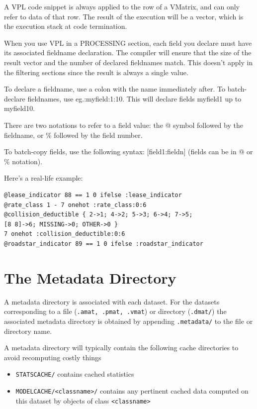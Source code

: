 \documentclass[11pt]{book}
\begin{document}
A VPL code snippet is always applied to the row of a VMatrix, and can only refer to data of that row. The result of the execution will be a vector, which is the execution stack at code termination. 

When you use VPL in a PROCESSING section, each field you declare must have its associated fieldname declaration. The compiler will ensure that the size of the result vector and the number of declared fieldnames match. This doesn't apply in the filtering sections since the result is always a single value. 

To declare a fieldname, use a colon with the name immediately after. To batch-declare fieldnames, use eg.:myfield:1:10. This will declare fields myfield1 up to myfield10.

There are two notations to refer to a field value: the @ symbol followed by the fieldname, or \% followed by the field number.

To batch-copy fields, use the following syntax: [field1:fieldn] (fields can be in @ or \% notation).

Here's a real-life example:

\begin{verbatim}
@lease_indicator 88 == 1 0 ifelse :lease_indicator
@rate_class 1 - 7 onehot :rate_class:0:6
@collision_deductible { 2->1; 4->2; 5->3; 6->4; 7->5; 
[8 8]->6; MISSING->0; OTHER->0 }
7 onehot :collision_deductible:0:6
@roadstar_indicator 89 == 1 0 ifelse :roadstar_indicator
\end{verbatim}

\section{The Metadata Directory}

A metadata directory is associated with each dataset.  For the datasets
corresponding to a file ({\tt .amat, .pmat, .vmat}) or directory ({\tt .dmat/}) the
associated metadata directory is obtained by appending {\tt .metadata/} to the
file or directory name.

A metadata directory will typically contain the following cache directories to avoid recomputing costly things

\begin{itemize}
\item \verb!STATSCACHE/! contains cached statistics
\item \verb!MODELCACHE/<classname>/! contains any pertinent cached data computed on this dataset by objects of class \verb!<classname>!
\end{itemize}
\end{document}
